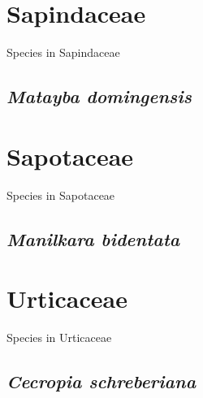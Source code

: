 \documentclass[
]{book}
\begin{document}
\hypertarget{sapindaceae}{%
\chapter{Sapindaceae}\label{sapindaceae}}

Species in Sapindaceae

\hypertarget{matayba-domingensis}{%
\section*{\texorpdfstring{\emph{Matayba domingensis}}{Matayba domingensis}}\label{matayba-domingensis}}

\hypertarget{sapotaceae}{%
\chapter{Sapotaceae}\label{sapotaceae}}

Species in Sapotaceae

\hypertarget{manilkara-bidentata}{%
\section*{\texorpdfstring{\emph{Manilkara bidentata}}{Manilkara bidentata}}\label{manilkara-bidentata}}

\hypertarget{urticaceae}{%
\chapter{Urticaceae}\label{urticaceae}}

Species in Urticaceae

\hypertarget{cecropia-schreberiana}{%
\section*{\texorpdfstring{\emph{Cecropia schreberiana}}{Cecropia schreberiana}}\label{cecropia-schreberiana}}

  
\end{document}
